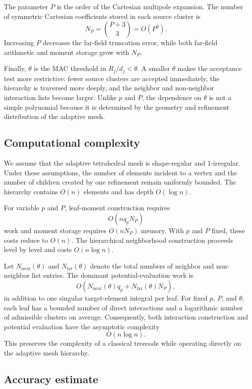 \documentclass[a4paper,10pt]{article}
\begin{document}
The parameter \(P\) is the order of the Cartesian multipole expansion.
The number of symmetric Cartesian coefficients stored in each source
cluster is
\[
N_P=\binom{P+3}{3}=O(P^3).
\]
Increasing \(P\) decreases the far-field truncation error, while both
far-field arithmetic and moment storage grow with \(N_P\).

Finally, \(\theta\) is the MAC threshold in
\(R_j/d_j<\theta\).  A smaller \(\theta\) makes the acceptance test more
restrictive: fewer source clusters are accepted immediately, the
hierarchy is traversed more deeply, and the neighbor and non-neighbor
interaction lists become larger.  Unlike \(p\) and \(P\), the dependence
on \(\theta\) is not a simple polynomial because it is determined by the
geometry and refinement distribution of the adaptive mesh.

\subsection{Computational complexity}

We assume that the adaptive tetrahedral mesh is shape-regular and
1-irregular.  Under these assumptions,
the number of elements incident to a vertex and the number of children
created by one refinement remain uniformly bounded.  The hierarchy
contains \(O(n)\) elements and has depth \(O(\log n)\).

For variable \(p\) and \(P\), leaf-moment construction requires
\[
O(nq_pN_P)
\]
work and moment storage requires \(O(nN_P)\) memory.  With \(p\) and \(P\)
fixed, these costs reduce to \(O(n)\).  The hierarchical neighborhood
construction proceeds level by level and costs \(O(n\log n)\).

Let \(N_{\mathrm{near}}(\theta)\) and
\(N_{\mathrm{far}}(\theta)\) denote the total numbers of neighbor and
non-neighbor list entries.  The dominant potential-evaluation work is
\[
O\!\left(
N_{\mathrm{near}}(\theta)q_p+
N_{\mathrm{far}}(\theta)N_P
\right),
\]
in addition to one singular target-element integral per leaf.  For fixed
\(p\), \(P\), and \(\theta\), each leaf has a bounded number of direct
interactions and a logarithmic number of admissible clusters on average.
Consequently, both interaction construction and potential evaluation have
the asymptotic complexity
\[
O(n\log n).
\]
This preserves the complexity of a classical treecode
\cite{Appel1985,Barnes1986} while operating directly on the adaptive mesh
hierarchy.

\subsection{Accuracy estimate}
\end{document}
